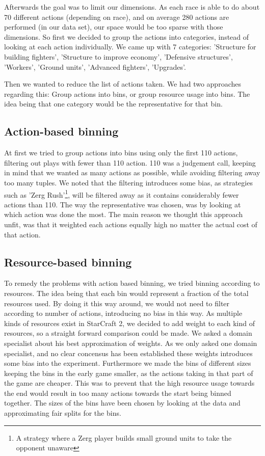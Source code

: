 \documentclass[a4paper,11pt]{article}
\begin{document}
Afterwards the goal was to limit our dimensions. As each race is able to do about 70 different actions (depending on race), and on average 280 actions are performed (in our data set), our space would be too sparse with those dimensions. So first we decided to group the actions into categories, instead of looking at each action individually. We came up with 7 categories: 'Structure for building fighters', 'Structure to improve economy', 'Defensive structures', 'Workers', 'Ground units', 'Advanced fighters', 'Upgrades'.

Then we wanted to reduce the list of actions taken. We had two approaches regarding this: Group actions into bins, or group resource usage into bins. The idea being that one category would be the representative for that bin.

\subsection{Action-based binning}
At first we tried to group actions into bins using only the first 110 actions, filtering out plays with fewer than 110 action. 110 was a judgement call, keeping in mind that we wanted as many actions as possible, while avoiding filtering away too many tuples.
We noted that the filtering introduces some bias, as strategies such as 'Zerg Rush'\footnote{A strategy where a Zerg player builds small ground units to take the opponent unaware}, will be filtered away as it contains considerably fewer actions than 110.
The way the representative was chosen, was by looking at which action was done the most. The main reason we thought this approach unfit, was that it weighted each actions equally high no matter the actual cost of that action. 

\subsection{Resource-based binning}
To remedy the problems with action based binning, we tried binning according to resources. The idea being that each bin would represent a fraction of the total resources used.
By doing it this way around, we would not need to filter according to number of actions, introducing no bias in this way.
As multiple kinds of resources exist in StarCraft 2, we decided to add weight to each kind of resources, so a straight forward comparison could be made. We asked a domain specialist about his best approximation of weights.
As we only asked one domain specialist, and no clear concensus has been established these weights introduces some bias into the experiment.
Furthermore we made the bins of different sizes keeping the bins in the early game smaller, as the actions taking in that part of the game are cheaper. This was to prevent that the high resource usage towards the end would result in too many actions towards the start being binned together. The sizes of the bins have been chosen by looking at the data and approximating fair splits for the bins.
\end{document}
